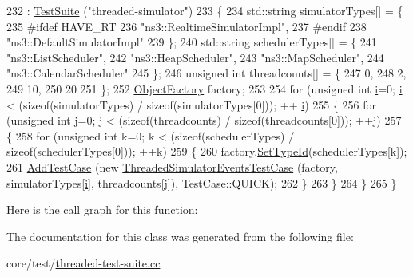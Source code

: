 \begin{DoxyCode}
232     : \hyperlink{classns3_1_1TestSuite_a904b0c40583b744d30908aeb94636d1a}{TestSuite} (\textcolor{stringliteral}{"threaded-simulator"})
233   \{
234     std::string simulatorTypes[] = \{
235 \textcolor{preprocessor}{#ifdef HAVE\_RT}
236       \textcolor{stringliteral}{"ns3::RealtimeSimulatorImpl"},
237 \textcolor{preprocessor}{#endif}
238       \textcolor{stringliteral}{"ns3::DefaultSimulatorImpl"}
239     \};
240     std::string schedulerTypes[] = \{
241       \textcolor{stringliteral}{"ns3::ListScheduler"},
242       \textcolor{stringliteral}{"ns3::HeapScheduler"},
243       \textcolor{stringliteral}{"ns3::MapScheduler"},
244       \textcolor{stringliteral}{"ns3::CalendarScheduler"}
245     \};
246     \textcolor{keywordtype}{unsigned} \textcolor{keywordtype}{int} threadcounts[] = \{
247       0,
248       2,
249       10, 
250       20
251     \};
252     \hyperlink{classns3_1_1ObjectFactory}{ObjectFactory} factory;
253     
254     \textcolor{keywordflow}{for} (\textcolor{keywordtype}{unsigned} \textcolor{keywordtype}{int} \hyperlink{bernuolliDistribution_8m_a6f6ccfcf58b31cb6412107d9d5281426}{i}=0; \hyperlink{bernuolliDistribution_8m_a6f6ccfcf58b31cb6412107d9d5281426}{i} < (\textcolor{keyword}{sizeof}(simulatorTypes) / \textcolor{keyword}{sizeof}(simulatorTypes[0])); ++
      \hyperlink{bernuolliDistribution_8m_a6f6ccfcf58b31cb6412107d9d5281426}{i}) 
255       \{
256         \textcolor{keywordflow}{for} (\textcolor{keywordtype}{unsigned} \textcolor{keywordtype}{int} j=0; j < (\textcolor{keyword}{sizeof}(threadcounts) / \textcolor{keyword}{sizeof}(threadcounts[0])); ++j)
257           \{
258             \textcolor{keywordflow}{for} (\textcolor{keywordtype}{unsigned} \textcolor{keywordtype}{int} k=0; k < (\textcolor{keyword}{sizeof}(schedulerTypes) / \textcolor{keyword}{sizeof}(schedulerTypes[0])); ++k) 
259               \{
260                 factory.\hyperlink{classns3_1_1ObjectFactory_a77dcd099064038a1eb7a6b8251229ec3}{SetTypeId}(schedulerTypes[k]);
261                 \hyperlink{classns3_1_1TestCase_a3718088e3eefd5d6454569d2e0ddd835}{AddTestCase} (\textcolor{keyword}{new} \hyperlink{classThreadedSimulatorEventsTestCase}{ThreadedSimulatorEventsTestCase} 
      (factory, simulatorTypes[\hyperlink{bernuolliDistribution_8m_a6f6ccfcf58b31cb6412107d9d5281426}{i}], threadcounts[j]), TestCase::QUICK);
262               \}
263           \}
264       \}
265   \}
\end{DoxyCode}


Here is the call graph for this function\+:




The documentation for this class was generated from the following file\+:\begin{DoxyCompactItemize}
\item 
core/test/\hyperlink{threaded-test-suite_8cc}{threaded-\/test-\/suite.\+cc}\end{DoxyCompactItemize}
